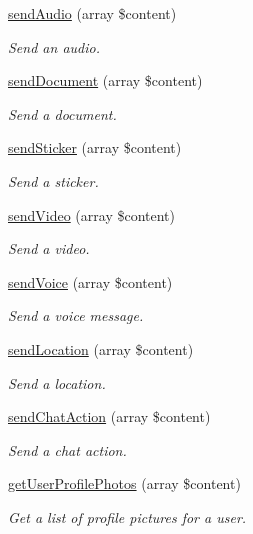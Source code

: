 \begin{DoxyCompactItemize}
\hyperlink{class_telegram_a178b081bbab51f83caa31e554b3e2ffe}{send\+Audio} (array \$content)
\begin{DoxyCompactList}\small\item\em Send an audio. \end{DoxyCompactList}\item 
\hyperlink{class_telegram_a25569ca763bd149891d86b89bc66cf54}{send\+Document} (array \$content)
\begin{DoxyCompactList}\small\item\em Send a document. \end{DoxyCompactList}\item 
\hyperlink{class_telegram_a0a176d232d8e7941184698447902beb6}{send\+Sticker} (array \$content)
\begin{DoxyCompactList}\small\item\em Send a sticker. \end{DoxyCompactList}\item 
\hyperlink{class_telegram_a789f27ed21d8a1232cc60832efdab17f}{send\+Video} (array \$content)
\begin{DoxyCompactList}\small\item\em Send a video. \end{DoxyCompactList}\item 
\hyperlink{class_telegram_a4faab9f92639453b851912d41ca1a3ca}{send\+Voice} (array \$content)
\begin{DoxyCompactList}\small\item\em Send a voice message. \end{DoxyCompactList}\item 
\hyperlink{class_telegram_ac395e843f13d36d70f57c2d26868a33f}{send\+Location} (array \$content)
\begin{DoxyCompactList}\small\item\em Send a location. \end{DoxyCompactList}\item 
\hyperlink{class_telegram_aa8c4c54f8f2fcbb53de050458fb176b7}{send\+Chat\+Action} (array \$content)
\begin{DoxyCompactList}\small\item\em Send a chat action. \end{DoxyCompactList}\item 
\hyperlink{class_telegram_af2245dc488830eb7add02c35e8dcf492}{get\+User\+Profile\+Photos} (array \$content)
\begin{DoxyCompactList}\small\item\em Get a list of profile pictures for a user. \end{DoxyCompactList}\item 

\end{DoxyCompactItemize}
